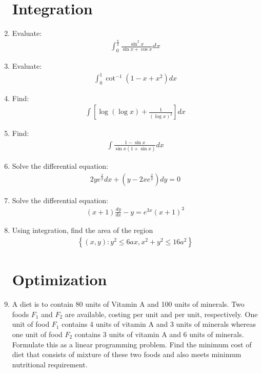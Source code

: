 \documentclass[12pt,-letter paper]{article}
\providecommand{\sbrak}[1]{\ensuremath{{}\left[#1\right]}}
\providecommand{\brak}[1]{\ensuremath{\left(#1\right)}}
\providecommand{\cbrak}[1]{\ensuremath{\left\{#1\right\}}}
\theoremstyle{remark}
\begin{document}
\begin{enumerate}
\section{Integration}
\item Evaluate: 
\begin{align*}
\int_0^\frac{\pi}{2} \frac{\sin^2x}{\sin x + \cos x} dx
\end{align*}
\item Evaluate:
\begin{align*}
\int_0^1 \cot^{-1}\brak{1 - x + x^2} dx
\end{align*}
\item Find: 
\begin{align*}
\int \sbrak{\log\brak{\log x} + \frac{1}{\brak{\log x}^2}} dx
\end{align*}
\item Find: 
\begin{align*}
\int \frac{1 - \sin x}{\sin x \brak{1 + \sin x}}dx
\end{align*}
\item Solve the differential equation: 
\begin{align*}
2y e^{\frac{x}{y}}dx + \brak{y - 2xe^{\frac{x}{y}}}dy = 0
\end{align*}
\item Solve the differential equation: 
\begin{align*}
\brak{x + 1} \frac{dy}{dx} - y = e^{3x}\brak{x + 1}^3
\end{align*}
\item Using integration, find the area of the region 
\begin{align*}
\cbrak{\brak{x,y} : y^2 \leq 6ax, x^2 + y^2 \leq 16a^2}
\end{align*}
\section{Optimization}
\item A diet is to contain 80 units of Vitamin A and 100 units of minerals. Two foods $F_1$ and $F_2$ are available, costing  per unit and  per unit, respectively. One unit of food $F_1$ contains 4 units of vitamin A and 3 units of minerals whereas one unit of food $F_2$ contains 3 units of vitamin A and 6 units of minerals. Formulate this as a linear programming problem. Find the minimum cost of diet that consists of mixture of these two foods and also meets minimum nutritional requirement.
\end{enumerate}
\end{document}
